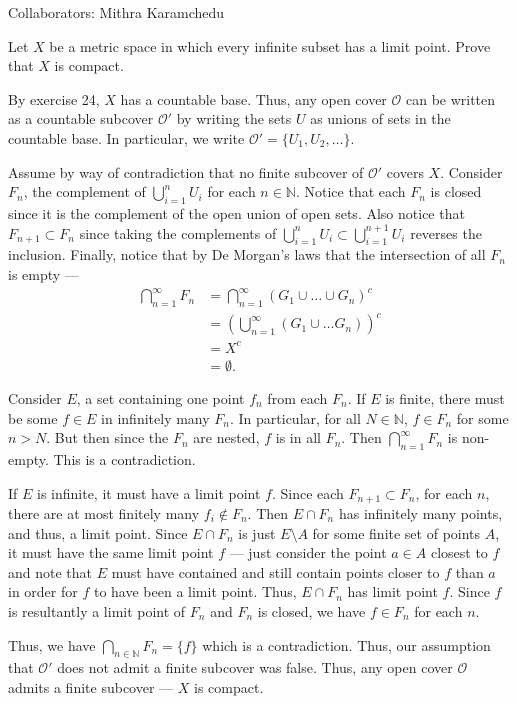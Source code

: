 \documentclass[12 pt, letterpaper]{hmcpset}
\begin{document}
Collaborators: Mithra Karamchedu

\begin{problem}
	Let $X$ be a metric space in which every infinite subset has a limit point. Prove that $X$ is compact.
\end{problem}

\begin{solution}
	By exercise 24, $X$ has a countable base. Thus, any open cover $\mathcal{O}$ can be written as a countable subcover $\mathcal{O}'$ by writing the sets $U$ as unions of sets in the countable base. In particular, we write $\mathcal{O}' = \{ U_{1}, U_{2}, \dots \}$.

	Assume by way of contradiction that no finite subcover of $\mathcal{O}'$ covers $X$. Consider $F_{n}$, the complement of $\bigcup_{i = 1}^{n} U_{i}$ for each $n \in \mathbb{N}$. Notice that each $F_{n}$ is closed since it is the complement of the open union of open sets. Also notice that $F_{n + 1} \subset F_{n}$ since taking the complements of $\bigcup_{i = 1}^{n} U_{i} \subset \bigcup_{i = 1}^{n + 1} U_{i}$ reverses the inclusion. Finally, notice that by De Morgan's laws that the intersection of all $F_{n}$ is empty ---
	\[
		\begin{split}
			\bigcap_{n = 1}^{\infty} F_{n} & = \bigcap_{n = 1}^{\infty} (G_{1} \cup \dots \cup G_{n})^{c} \\
						       & = \left ( \bigcup_{n = 1}^{\infty} (G_{1} \cup \dots G_{n}) \right )^{c} \\
						       & = X^{c} \\
						       & = \emptyset.
		\end{split}
	\]

	Consider $E$, a set containing one point $f_{n}$ from each $F_{n}$. If $E$ is finite, there must be some $f \in E$ in infinitely many $F_{n}$. In particular, for all $N \in \mathbb{N}$, $f \in F_{n}$ for some $n > N$. But then since the $F_{n}$ are nested, $f$ is in all $F_{n}$. Then $\bigcap_{n = 1}^{\infty} F_{n}$ is non-empty. This is a contradiction.

	If $E$ is infinite, it must have a limit point $f$. Since each $F_{n + 1} \subset F_n$, for each $n$, there are at most finitely many $f_{i} \notin F_{n}$. Then $E \cap F_{n}$ has infinitely many points, and thus, a limit point. Since $E \cap F_{n}$ is just $E \setminus A$ for some finite set of points $A$, it must have the same limit point $f$ --- just consider the point $a \in A$ closest to $f$ and note that $E$ must have contained and still contain points closer to $f$ than $a$ in order for $f$ to have been a limit point. Thus, $E \cap F_{n}$ has limit point $f$. Since $f$ is resultantly a limit point of $F_{n}$ and $F_{n}$ is closed, we have $f \in F_{n}$ for each $n$.

	Thus, we have $\bigcap_{n \in \mathbb{N}} F_{n} = \{ f \}$ which is a contradiction. Thus, our assumption that $\mathcal{O}'$ does not admit a finite subcover was false. Thus, any open cover $\mathcal{O}$ admits a finite subcover --- $X$ is compact.
\end{solution}
\end{document}
